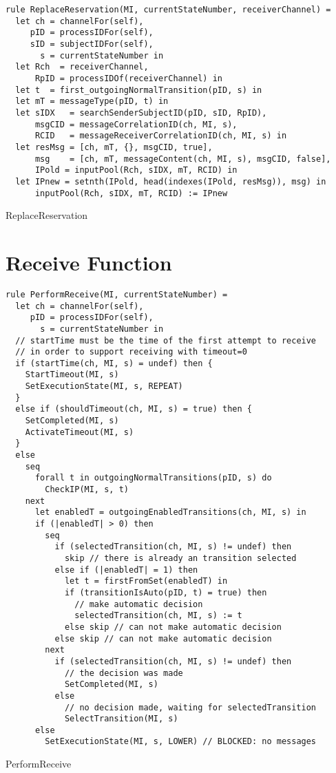 \begin{listing}[H]
\begin{verbatim}
rule ReplaceReservation(MI, currentStateNumber, receiverChannel) =
  let ch = channelFor(self),
     pID = processIDFor(self),
     sID = subjectIDFor(self),
       s = currentStateNumber in
  let Rch  = receiverChannel,
      RpID = processIDOf(receiverChannel) in
  let t  = first_outgoingNormalTransition(pID, s) in
  let mT = messageType(pID, t) in
  let sIDX   = searchSenderSubjectID(pID, sID, RpID),
      msgCID = messageCorrelationID(ch, MI, s),
      RCID   = messageReceiverCorrelationID(ch, MI, s) in
  let resMsg = [ch, mT, {}, msgCID, true],
      msg    = [ch, mT, messageContent(ch, MI, s), msgCID, false],
      IPold = inputPool(Rch, sIDX, mT, RCID) in
  let IPnew = setnth(IPold, head(indexes(IPold, resMsg)), msg) in
      inputPool(Rch, sIDX, mT, RCID) := IPnew
\end{verbatim}
\caption{ReplaceReservation}
\label{lst:asm:ReplaceReservation}
\end{listing}



\section{Receive Function}


\begin{listing}[H]
\begin{verbatim}
rule PerformReceive(MI, currentStateNumber) =
  let ch = channelFor(self),
     pID = processIDFor(self),
       s = currentStateNumber in
  // startTime must be the time of the first attempt to receive
  // in order to support receiving with timeout=0
  if (startTime(ch, MI, s) = undef) then {
    StartTimeout(MI, s)
    SetExecutionState(MI, s, REPEAT)
  }
  else if (shouldTimeout(ch, MI, s) = true) then {
    SetCompleted(MI, s)
    ActivateTimeout(MI, s)
  }
  else
    seq
      forall t in outgoingNormalTransitions(pID, s) do
        CheckIP(MI, s, t)
    next
      let enabledT = outgoingEnabledTransitions(ch, MI, s) in
      if (|enabledT| > 0) then
        seq
          if (selectedTransition(ch, MI, s) != undef) then
            skip // there is already an transition selected
          else if (|enabledT| = 1) then
            let t = firstFromSet(enabledT) in
            if (transitionIsAuto(pID, t) = true) then
              // make automatic decision
              selectedTransition(ch, MI, s) := t
            else skip // can not make automatic decision
          else skip // can not make automatic decision
        next
          if (selectedTransition(ch, MI, s) != undef) then
            // the decision was made
            SetCompleted(MI, s)
          else
            // no decision made, waiting for selectedTransition
            SelectTransition(MI, s)
      else
        SetExecutionState(MI, s, LOWER) // BLOCKED: no messages
\end{verbatim}
\caption{PerformReceive}
\label{lst:asm:PerformReceive}
\end{listing}


